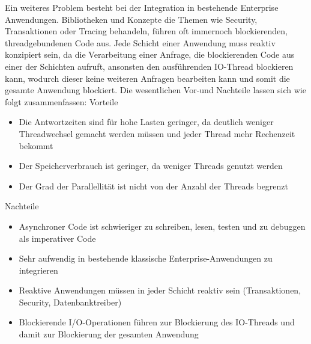 Ein weiteres Problem besteht bei der Integration in bestehende Enterprise Anwendungen. Bibliotheken und Konzepte die Themen wie
Security, Transaktionen oder Tracing behandeln, führen oft immernoch blockierenden, threadgebundenen Code aus.
Jede Schicht einer Anwendung muss reaktiv konzipiert sein, da die Verarbeitung einer Anfrage, die blockierenden Code aus einer der
Schichten aufruft, ansonsten den ausführenden IO-Thread blockieren kann, wodurch dieser keine weiteren Anfragen bearbeiten kann und somit die gesamte Anwendung blockiert.
\newline\newline
Die wesentlichen Vor-und Nachteile lassen sich wie folgt zusammenfassen:
\newline
\newline
Vorteile
\begin{itemize}
    \item Die Antwortzeiten sind für hohe Lasten geringer, da deutlich weniger Threadwechsel gemacht werden müssen und jeder Thread
          mehr Rechenzeit bekommt
    \item Der Speicherverbrauch ist geringer, da weniger Threads genutzt werden
    \item Der Grad der Parallellität ist nicht von der Anzahl der Threads begrenzt
\end{itemize}
Nachteile
\begin{itemize}
    \item Asynchroner Code ist schwieriger zu schreiben, lesen, testen und zu debuggen als imperativer Code
    \item Sehr aufwendig in bestehende klassische Enterprise-Anwendungen zu integrieren
    \item Reaktive Anwendungen müssen in jeder Schicht reaktiv sein (Transaktionen, Security, Datenbanktreiber)
    \item Blockierende I/O-Operationen führen zur Blockierung des IO-Threads und damit zur Blockierung der gesamten Anwendung
\end{itemize}

